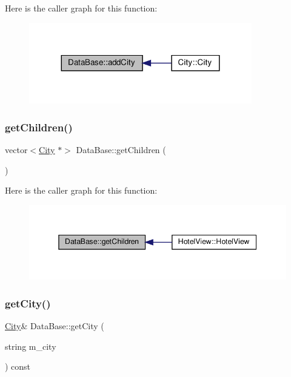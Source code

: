 Here is the caller graph for this function\+:\nopagebreak
\begin{figure}[H]
\begin{center}
\leavevmode
\includegraphics[width=275pt]{class_data_base_a090b459850b95afaaa23cba4339508e3_icgraph}
\end{center}
\end{figure}
\mbox{\label{class_data_base_af0444cd53bc289472c9e2f09a83afaf4}} 
\subsubsection{\texorpdfstring{get\+Children()}{getChildren()}}
{\footnotesize\ttfamily vector$<$\hyperlink{class_city}{City} $\ast$$>$ Data\+Base\+::get\+Children (\begin{DoxyParamCaption}{ }\end{DoxyParamCaption})\hspace{0.3cm}{\ttfamily [inline]}}

Here is the caller graph for this function\+:\nopagebreak
\begin{figure}[H]
\begin{center}
\leavevmode
\includegraphics[width=345pt]{class_data_base_af0444cd53bc289472c9e2f09a83afaf4_icgraph}
\end{center}
\end{figure}
\mbox{\label{class_data_base_acf702c18049dec5367c04249c8b431f7}} 
\subsubsection{\texorpdfstring{get\+City()}{getCity()}}
{\footnotesize\ttfamily \hyperlink{class_city}{City}\& Data\+Base\+::get\+City (\begin{DoxyParamCaption}\item[{string}]{m\+\_\+city }\end{DoxyParamCaption}) const\hspace{0.3cm}{\ttfamily [inline]}}

